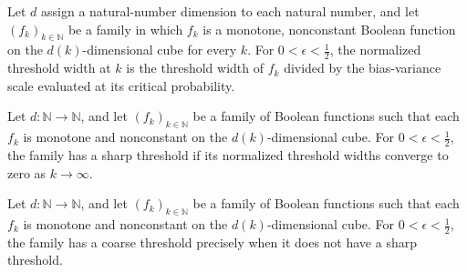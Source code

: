 \begin{definition}
\label{FABL.normalizedThresholdWidth}
\leanok
{}
Let $d$ assign a natural-number dimension to each natural number, and let
$(f_k)_{k\in\mathbb N}$ be a family in which $f_k$ is a monotone, nonconstant Boolean
function on the $d(k)$-dimensional cube for every $k$. For $0<\epsilon<\tfrac12$, the
normalized threshold width at $k$ is the threshold width of $f_k$ divided by the
bias-variance scale evaluated at its critical probability.
\end{definition}

\begin{definition}
\label{FABL.HasSharpThreshold}
\leanok
{}
Let $d:\mathbb N\to\mathbb N$, and let $(f_k)_{k\in\mathbb N}$ be a family of Boolean
functions such that each $f_k$ is monotone and nonconstant on the $d(k)$-dimensional
cube. For $0<\epsilon<\tfrac12$, the family has a sharp threshold if its normalized
threshold widths converge to zero as $k\to\infty$.
\end{definition}

\begin{definition}
\label{FABL.HasCoarseThreshold}
\leanok
{}
Let $d:\mathbb N\to\mathbb N$, and let $(f_k)_{k\in\mathbb N}$ be a family of Boolean
functions such that each $f_k$ is monotone and nonconstant on the $d(k)$-dimensional
cube. For $0<\epsilon<\tfrac12$, the family has a coarse threshold precisely when it
does not have a sharp threshold.
\end{definition}

